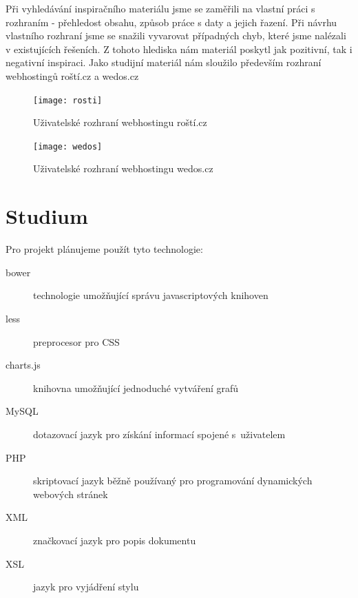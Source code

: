 \documentclass[11pt,a4paper]{article}
\begin{document}
    Při vyhledávání inspiračního materiálu jsme se zaměřili na vlastní práci s
    rozhraním - přehledost obsahu, způsob práce s daty a jejich řazení.
    Při návrhu vlastního rozhraní jsme se snažili vyvarovat případných chyb,
    které jsme nalézali v existujících řešeních. Z tohoto hlediska nám
    materiál poskytl jak pozitivní, tak i negativní inspiraci.  Jako studijní
    materiál nám sloužilo především rozhraní webhostingů roští.cz a wedos.cz \\
    \begin{figure}[ht]
      \begin{center}
        \texttt{[image: rosti]}
        \caption{Uživatelské rozhraní webhostingu roští.cz}
      \end{center}
    \end{figure}
    \begin{figure}[ht]
      \begin{center}
        \texttt{[image: wedos]}
        \caption{Uživatelské rozhraní webhostingu wedos.cz}
      \end{center}
    \end{figure}

  \section{Studium}

    Pro projekt plánujeme použít tyto technologie:
    \begin{description}
      \item[bower] technologie umožňující správu javascriptových knihoven
      \item[less] preprocesor pro CSS
      \item[charts.js] knihovna umožňující jednoduché vytváření grafů
      \item[MySQL] dotazovací jazyk pro získání informací spojené s~uživatelem
      \item[PHP] skriptovací jazyk běžně používaný pro programování
                   dynamických webových stránek
      \item[XML] značkovací jazyk pro popis dokumentu
      \item[XSL] jazyk pro vyjádření stylu
    \end{description}

\end{document}
